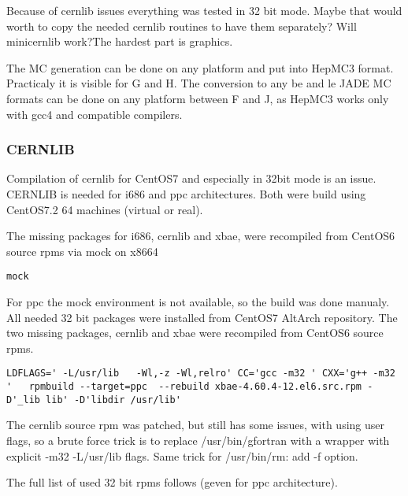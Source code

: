 Because of cernlib issues everything was tested in 32 bit mode.
Maybe that would worth to copy the needed cernlib routines to have them separately?
Will minicernlib work?The hardest part is graphics.

The MC generation can be done on any platform and put into HepMC3 format.
Practicaly it is visible for G and H.
The conversion to any be and le JADE MC formats can be done on any platform between F and J,
as HepMC3 works only with gcc4 and compatible compilers. 



\subsubsection{CERNLIB}
Compilation of cernlib for CentOS7 and especially in 32bit mode is an issue.
CERNLIB is needed for i686 and ppc architectures.
Both were build using CentOS7.2 64 machines (virtual or real).



The missing packages for i686, cernlib and xbae, were recompiled from CentOS6 source rpms via mock on x8664
\begin{verbatim}
mock
\end{verbatim}



For ppc the mock environment is not available, so the build was done manualy.
All needed 32 bit packages were installed from CentOS7 AltArch repository.
The two missing packages, cernlib and xbae were recompiled from CentOS6 source rpms.
\begin{Verbatim}[fontsize=\tiny]
LDFLAGS=' -L/usr/lib   -Wl,-z -Wl,relro' CC='gcc -m32 ' CXX='g++ -m32 '   rpmbuild --target=ppc  --rebuild xbae-4.60.4-12.el6.src.rpm -D'_lib lib' -D'libdir /usr/lib'
\end{Verbatim}
The cernlib source rpm was patched, but still has some issues, with using user flags, so
a brute force trick is to replace /usr/bin/gfortran with a wrapper with explicit -m32 -L/usr/lib flags.
Same trick for /usr/bin/rm:   add -f option.

The full list of used 32 bit rpms follows (geven for ppc architecture).


